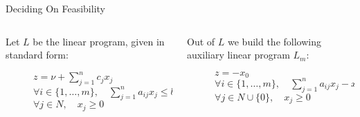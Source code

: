 \documentclass[32pt, aspectratio = 169]{beamer}
\begin{document}
\begin{frame}{Deciding On Feasibility}
  \begin{columns}[T]
    \begin{column}{.5\textwidth}
      Let $L$ be the linear program, given in standard form:
      \begin{figure}
        \begin{linearProgG}{
            ${\displaystyle z = \nu + \sum_{j=1}^n c_jx_j}$
          }{
            ${\displaystyle \forall i \in \{1, \ldots, m\}, \quad \sum_{j=1}^n a_{ij}x_j \leq b_i}$
          }{
            $\forall j \in N, \quad x_j \geq 0$
          }
        \end{linearProgG}
      \end{figure}
    \end{column}
    \begin{column}{.58\textwidth}
      \pause
      \begin{tcolorbox}[
        enhanced,
        parbox = true,
        colback = mLightBrown!30!white,
        colframe = mLightBrown!30!white,
        arc = 0mm,
        ]
        Out of $L$ we build the following auxiliary linear program $L_{m}$:
        \vspace{-1em}
        \begin{figure}
          \begin{linearProgG}{
              ${\displaystyle z = - x_0}$
            }{
              ${\displaystyle \forall i \in \{1, \ldots, m\}, \quad \sum_{j=1}^n a_{ij}x_j - x_0\leq b_i}$
            }{
              $\forall j \in N\cup \{0\}, \quad x_j \geq 0$
            }
          \end{linearProgG}
        \end{figure}
      \end{tcolorbox}
    \end{column}
  \end{columns}
\end{frame}
\end{document}
